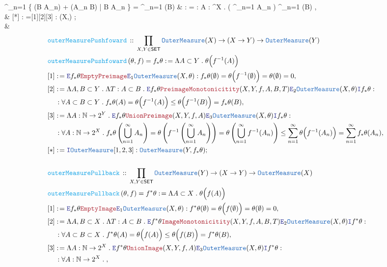 \documentclass[12pt]{scrartcl}
\newcommand{\TYPE}[1]{\textcolor{NavyBlue}{\mathtt{#1}}}
\newcommand{\FUNC}[1]{\textcolor{Cerulean}{\mathtt{#1}}}
\newcommand{\LOGIC}[1]{\textcolor{Blue}{\mathtt{#1}}}
\newcommand{\THM}[1]{\textcolor{Maroon}{\mathtt{#1}}}
\renewcommand{\.}{\; . \;}
\newcommand{\de}{: \kern 0.1pc =}
\newcommand{\Act}[1]{\left( #1 \right)}
\newcommand{\DeclareFunc}[2]{& \FUNC{#1} \, :: \, #2 \\}
\newcommand{\DefineNamedFunc}[4]{&  \FUNC{#1}\Act{#2} = #3 \de #4 \\}
\newcommand{\NewLine}{\\ & \kern 1pc}
\newcommand{\Page}[1]{ \begin{align*} #1 \end{align*}   }
\newcommand{\Intro}{\LOGIC{I}}
\newcommand{\Elim}{\LOGIC{E}}
\newcommand{\Nat}{\mathbb{N} }
\newcommand{\Say}[3]{& #1 \de #2 : #3, \\}
\newcommand{\Conclude}[3]{& #1 \de #2 : #3; \\}
\newcommand{\Derive}[3]{& \leadsto #1 \de #2 : #3, \\}
\newcommand{\QED}{\; \square}
\newcommand{\EndProof}{& \QED \\}
\newcommand{\SET}{\mathsf{SET}}
\newcommand{\OM}{\TYPE{OuterMeasure}}
\begin{document}
{{		\sum^\infty_{n=1} 
		\inf \Big\{
			\alpha(B \cap A_n) + \beta(A_n \setminus B)  \Big|
			B \subset A_n
		\Big\} =
		\sum^\infty_{n=1} \alpha \wedge \beta (B)
	}
	\Derive{[3]}{\Intro \forall}
	{
		\forall A : \Nat {}^X \. 
		\alpha \wedge \beta\left( \bigcup^\infty_{n=1} A_n \right)	\le 
		\sum^\infty_{n=1} \alpha \wedge \beta (B)
	}
	\Conclude{[*]}{\Intro \OM [1][2][3]}
	{
		\OM(X,\alpha \wedge \beta)	
	}
	\EndProof
}\Page{
	\DeclareFunc{outerMeasurePushfoward}
	{
		\prod_{X,Y \in \SET}  \OM(X) \to (X \to Y) \to \OM(Y)	
	}
	\DefineNamedFunc{outerMeasurePushfoward}{\theta,f}{f_* \theta}
	{
		\Lambda A \subset Y \.  \theta\Big( f^{-1}(A) \Big)	
	}
	\Say{[1]}{\Elim f_* \theta \THM{EmptyPreimage} \Elim_1 \OM(X,\theta)}
	{
		f_* \theta(\emptyset) = 
		\theta \Big( f^{-1}(\emptyset) \Big)	=
		\theta(\emptyset) = 0
	}
	\Say{[2]}{
		\Lambda A,B \subset Y \.
		\Lambda T : A \subset B \.
		\Elim f_* \theta \THM{PreimageMonotonicitity}(X,Y,f,A,B,T) \Elim_2 \OM(X,\theta) \Intro f_* \theta}
	{
		\NewLine :		
		\forall A \subset B \subset Y \.		
		f_* \theta(A) = 
		\theta \Big( f^{-1}(A) \Big)	\le 
		\theta \Big( f^{-1}(B) \Big) =
		f_* \theta(B)	
	}
	\Say{[3]}{
		\Lambda A : \Nat \to 2^Y \.		
		\Elim f_* \theta \THM{UnionPreimage}(X,Y,f,A) \Elim_3 \OM(X,\theta) \Intro f_* \theta
	}
	{
		\NewLine :		
		\forall A : \Nat \to 2^X \.		
		f_* \theta\left(  \bigcup^\infty_{n=1} A_n \right) = 
		\theta \left( f^{-1}\left(\bigcup^\infty_{n=1} A_n\right) \right)	=
		\theta \left( \bigcup^\infty_{n=1} f^{-1}(A_n) \right) \le 
		\sum^\infty_{n=1} \theta\Big( f^{-1}(A_n) \Big)  =
		\sum^\infty_{n=1} f_* \theta(A_n)
	}
	\Conclude{[*]}{\Intro \OM[1,2,3]}
	{
		\OM(Y, f_* \theta)
	}
	\\
	\DeclareFunc{outerMeasurePullback}
	{
		\prod_{X,Y \in \SET}  \OM(Y) \to (X \to Y) \to \OM(X)	
	}
	\DefineNamedFunc{outerMeasurePullback}{\theta,f}{f^* \theta}
	{
		\Lambda A \subset X \.  \theta\Big( f(A) \Big)	
	}
	\Say{[1]}{\Elim f_* \theta \THM{EmptyImage} \Elim_1 \OM(X,\theta)}
	{
		f^* \theta(\emptyset) = 
		\theta \Big( f(\emptyset) \Big)	=
		\theta(\emptyset) = 0
	}
	\Say{[2]}{
		\Lambda A,B \subset X \.
		\Lambda T : A \subset B \.
		\Elim f^* \theta \THM{ImageMonotonicitity}(X,Y,f,A,B,T) \Elim_2 \OM(X,\theta) \Intro f^* \theta}
	{
		\NewLine :		
		\forall A \subset B \subset X \.		
		f^* \theta(A) = 
		\theta \Big( f(A) \Big)	\le 
		\theta \Big( f(B) \Big) =
		f^* \theta(B)	
	}
	\Say{[3]}{
		\Lambda A : \Nat \to 2^X \.		
		\Elim f^* \theta \THM{UnionImage}(X,Y,f,A) \Elim_3 \OM(X,\theta) \Intro f^* \theta
	}
	{
		\NewLine :		
		\forall A : \Nat \to 2^X \.		
}}
\end{document}
